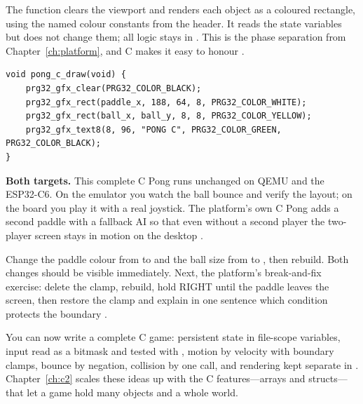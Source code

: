 The  function clears the viewport and renders each object as a coloured
rectangle, using the named colour constants from the header. It reads the state
variables but does not change them; all logic stays in . This is the
phase separation from Chapter~\ref{ch:platform}, and C makes it easy to honour
\citep{prg32tutorialc}.

\begin{lstlisting}[style=c,caption={Rendering the frame. \code{draw} only reads state and puts pixels; it changes nothing.}]
void pong_c_draw(void) {
    prg32_gfx_clear(PRG32_COLOR_BLACK);
    prg32_gfx_rect(paddle_x, 188, 64, 8, PRG32_COLOR_WHITE);
    prg32_gfx_rect(ball_x, ball_y, 8, 8, PRG32_COLOR_YELLOW);
    prg32_gfx_text8(8, 96, "PONG C", PRG32_COLOR_GREEN, PRG32_COLOR_BLACK);
}
\end{lstlisting}

\begin{prgtargets}
\textbf{Both targets.} This complete C Pong runs unchanged on QEMU and the
ESP32\nobreakdash-C6. On the emulator you watch the ball bounce and verify the layout; on
the board you play it with a real joystick. The platform's own C Pong adds a second
paddle with a fallback AI so that even without a second player the two-player
screen stays in motion on the desktop \citep{prg32qemu}.
\end{prgtargets}

\begin{prgtry}
Change the paddle colour from  to
 and the ball size from  to , then
rebuild. Both changes should be visible immediately. Next, the platform's
break-and-fix exercise: delete the  clamp, rebuild, hold
RIGHT until the paddle leaves the screen, then restore the clamp and explain in one
sentence which condition protects the boundary \citep{prg32tutorialc}.
\end{prgtry}

\begin{prgcheck}
You can now write a complete C game: persistent state in file-scope variables,
input read as a bitmask and tested with \code{\&}, motion by velocity with
boundary clamps, bounce by negation, collision by one call, and rendering kept
separate in . Chapter~\ref{ch:c2} scales these ideas up with the C
features---arrays and structs---that let a game hold many objects and a whole
world.
\end{prgcheck}

